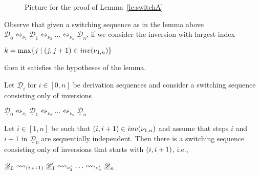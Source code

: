 \documentclass[a4paper,UKenglish,cleveref,pdftex,thm-restate,numberwithinsect]{lipics-v2021}
\newcommand{\interval}[2][1]{\ensuremath{[{#1},{#2}]}}
\newcommand{\dder}[1]{\mathscr{#1}}
\newcommand{\der}[1]{\underline{\dder{#1}}}
\newcommand{\inv}[1]{\mathsf{inv}({#1})}
\newcommand{\shift}[1]{\ensuremath{\mathrel{{\leftrightsquigarrow}_{#1}}}}
\begin{document}
\begin{figure}
  \caption{Picture for the proof of Lemma~\ref{le:switchA}}
  \label{fi:switchA}
\end{figure}


\begin{remark}
  \label{rem:switchA}
  Observe that given a switching sequence as in the lemma above
  $\der{D}_0 \shift{\nu_1} \der{D}_1 \shift{\nu_2} \ldots
  \shift{\nu_n} \der{D}_n$, if we consider the inversion with largest index
  \begin{center}
    $k = \max \{j \mid \transp{j} \in \inv{\nu_{1,n}}\}$
  \end{center}
  then it satisfies the hypotheses of the lemma.
\end{remark}

\begin{lemma}
  \label{le:switchB}
  Let $\der{D}_i$ for $i \in \interval[0]{n}$ be derivation sequences
  and consider a switching sequence consisting only of inversions
  \begin{center}
    $\der{D}_0 \shift{\nu_1} \der{D}_1 \shift{\nu_2} \ldots
    \shift{\nu_n} \der{D}_n$
  \end{center}
  Let $i \in \interval{n}$ be such that
  $\transp{i} \in \inv{\nu_{1,n}}$ and assume that steps $i$ and $i+1$ in $\der{D}_0$ are sequentially independent. Then there is a switching sequence
  consisting only of inversions that starts with $\transp{i}$, i.e.,
  \begin{center}
    $\der{D}_0 \shift{\transp{i}} \der{D}_1' \shift{\nu_2'} \ldots
    \shift{\nu_n'} \der{D}_n$
  \end{center}
\end{lemma}
\end{document}
